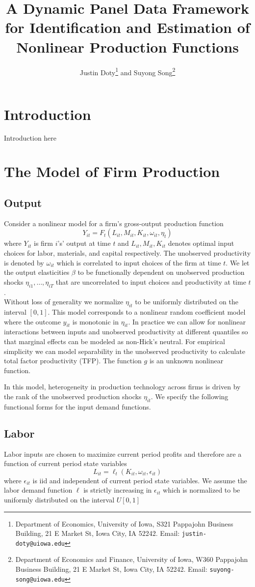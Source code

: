 \documentclass{article}
\title{A Dynamic Panel Data Framework for Identification and Estimation of Nonlinear Production Functions}
\author{Justin Doty\thanks{Department of Economics, University of Iowa, S321 Pappajohn Business Building, 21 E Market St, Iowa City, IA 52242. Email: \texttt{justin-doty@uiowa.edu}} and Suyong Song\thanks{Department of Economics and Finance, University of Iowa, W360 Pappajohn Business Building, 21 E Market St, Iowa City, IA 52242. Email: \texttt{suyong-song@uiowa.edu}}
}
\date{\vspace{-5ex}}
\begin{document}
\maketitle{} 
\section{Introduction}
Introduction here
\section{The Model of Firm Production}

\subsection{Output}
Consider a nonlinear model for a firm's gross-output production function
\begin{equation}\label{modelY}
Y_{it}=F_{t}(L_{it}, M_{it}, K_{it}, \omega_{it}, \eta_{t})
\end{equation}
where $Y_{it}$ is firm $i$'s' output at time $t$ and $L_{it}, M_{it}, K_{it}$ denotes optimal input choices for labor, materials, and capital respectively. The unobserved productivity is denoted by $\omega_{it}$ which is correlated to input choices of the firm at time $t$. We let the output elasticities $\beta$ to be functionally dependent on unobserved production shocks $\eta_{i1},\dots, \eta_{iT}$ that are uncorrelated to input choices and productivity at time $t$.\\

Without loss of generality we normalize $\eta_{it}$ to be uniformly distributed on the interval $[0,1]$. This model corresponds to a nonlinear random coefficient model where the outcome $y_{it}$ is monotonic in $\eta_{it}$. In practice we can allow for nonlinear interactions between inputs and unobserved productivity at different quantiles so that marginal effects can be modeled as non-Hick's neutral. For empirical simplicity we can model separability in the unobserved productivity to calculate total factor productivity (TFP). The function $g$ is an unknown nonlinear function.

In this model, heterogeneity in production technology across firms is driven by the rank of the unobserved production shocks $\eta_{it}$. We specify the following functional forms for the input demand functions.

\subsection{Labor} 
Labor inputs are chosen to maximize current period profits and therefore are a function of current period state variables
\begin{equation} \label{modelL}
L_{it}=\ell_{t}(K_{it}, \omega_{it}, \epsilon_{it})
\end{equation}
where $\epsilon_{it}$ is iid and independent of current period state variables. We assume the labor demand function $\ell$ is strictly increasing in $\epsilon_{it}$ which is normalized to be uniformly distributed on the interval $U[0,1]$
\end{document}
